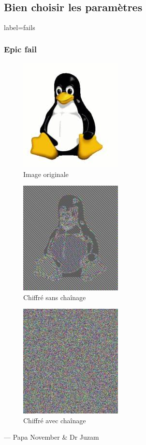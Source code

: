 \documentclass{beamer}
\begin{document}
    \subsection{Bien choisir les paramètres}
        \begin{frame}{label=fails}
            \frametitle{Epic fail}
            \begin{center}
                \begin{figure}
                    \includegraphics[scale=0.15]{img/plain.jpg}
                    \caption{Image originale}
                \end{figure}
                \pause
                \begin{figure}
                    \includegraphics[scale=0.15]{img/aes_no_chain.jpg}
                    \caption{Chiffré sans chaînage}
                \end{figure}
                \pause
                \begin{figure}
                    \includegraphics[scale=0.15]{img/aes_chain.jpg}
                    \caption{Chiffré avec chaînage}
                \end{figure}
                \cc --- Papa November \& Dr Juzam
            \end{center}
        \end{frame}
\end{document}
